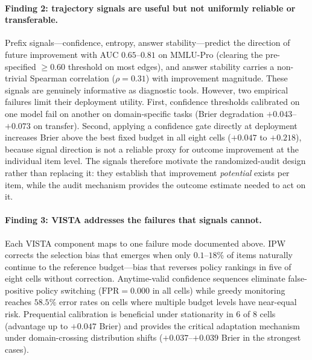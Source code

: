 \documentclass[a4paper,fleqn]{cas-sc}
\theoremstyle{plain}
\theoremstyle{definition}
\theoremstyle{remark}
\begin{document}
\paragraph{Finding 2: trajectory signals are useful but not uniformly reliable
or transferable.}
Prefix signals---confidence, entropy, answer stability---predict the direction
of future improvement with AUC $0.65$--$0.81$ on MMLU-Pro (clearing the
pre-specified $\geq 0.60$ threshold on most edges), and answer stability
carries a non-trivial Spearman correlation ($\rho=0.31$) with improvement
magnitude.
These signals are genuinely informative as diagnostic tools.
However, two empirical failures limit their deployment utility.
First, confidence thresholds calibrated on one model fail on another on
domain-specific tasks (Brier degradation $+0.043$--$+0.073$ on transfer).
Second, applying a confidence gate directly at deployment increases Brier
above the best fixed budget in all eight cells ($+0.047$ to $+0.218$),
because signal direction is not a reliable proxy for outcome improvement at
the individual item level.
The signals therefore motivate the randomized-audit design rather than
replacing it: they establish that improvement \emph{potential} exists per
item, while the audit mechanism provides the outcome estimate needed to act
on it.

\paragraph{Finding 3: VISTA addresses the failures that signals cannot.}
Each VISTA component maps to one failure mode documented above.
IPW corrects the selection bias that emerges when only $0.1$--$18\%$ of items
naturally continue to the reference budget---bias that reverses policy
rankings in five of eight cells without correction.
Anytime-valid confidence sequences eliminate false-positive policy switching
($\mathrm{FPR}=0.000$ in all cells) while greedy monitoring reaches $58.5\%$
error rates on cells where multiple budget levels have near-equal risk.
Prequential calibration is beneficial under stationarity in 6 of 8 cells
(advantage up to $+0.047$ Brier) and provides the critical adaptation
mechanism under domain-crossing distribution shifts ($+0.037$--$+0.039$ Brier
in the strongest cases).
\end{document}
